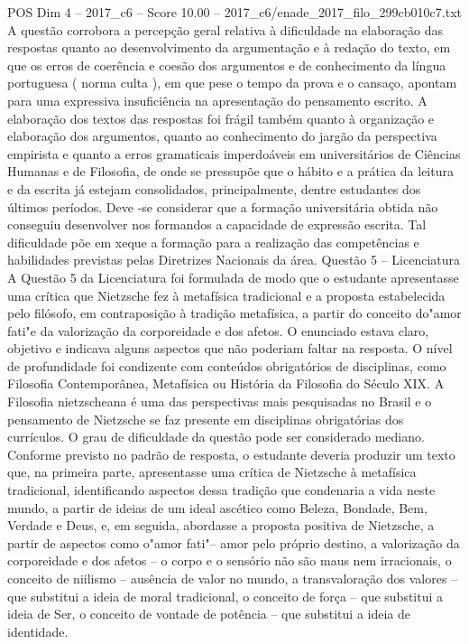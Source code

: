 \begin{textsample}{POS Dim 4 – 2017\_c6 – Score 10.00 – 2017\_c6/enade\_2017\_filo\_299cb010c7.txt}
A questão corrobora a percepção geral relativa à dificuldade na elaboração das respostas quanto ao desenvolvimento da argumentação e à redação do texto, em que os erros de coerência e coesão dos argumentos e de conhecimento da língua portuguesa ( norma culta ), em que pese o tempo da prova e o cansaço, apontam para uma expressiva insuficiência na apresentação do pensamento escrito.
A elaboração dos textos das respostas foi frágil também quanto à organização e elaboração dos argumentos, quanto ao conhecimento do jargão da perspectiva empirista e quanto a erros gramaticais imperdoáveis em universitários de Ciências Humanas e de Filosofia, de onde se pressupõe que o hábito e a prática da leitura e da escrita já estejam consolidados, principalmente, dentre estudantes dos últimos períodos.
Deve -se considerar que a formação universitária obtida não conseguiu desenvolver nos formandos a capacidade de expressão escrita.
Tal dificuldade põe em xeque a formação para a realização das competências e habilidades previstas pelas Diretrizes Nacionais da área.
Questão 5 – Licenciatura A Questão 5 da Licenciatura foi formulada de modo que o estudante apresentasse uma crítica que Nietzsche fez à metafísica tradicional e a proposta estabelecida pelo filósofo, em contraposição à tradição metafísica, a partir do conceito do"amor fati"e da valorização da corporeidade e dos afetos.
O enunciado estava claro, objetivo e indicava alguns aspectos que não poderiam faltar na resposta.
O nível de profundidade foi condizente com conteúdos obrigatórios de disciplinas, como Filosofia Contemporânea, Metafísica ou História da Filosofia do Século XIX.
A Filosofia nietzscheana é uma das perspectivas mais pesquisadas no Brasil e o pensamento de Nietzsche se faz presente em disciplinas obrigatórias dos currículos.
O grau de dificuldade da questão pode ser considerado mediano.
Conforme previsto no padrão de resposta, o estudante deveria produzir um texto que, na primeira parte, apresentasse uma crítica de Nietzsche à metafísica tradicional, identificando aspectos dessa tradição que condenaria a vida neste mundo, a partir de ideias de um ideal ascético como Beleza, Bondade, Bem, Verdade e Deus, e, em seguida, abordasse a proposta positiva de Nietzsche, a partir de aspectos como o"amor fati"– amor pelo próprio destino, a valorização da corporeidade e dos afetos – o corpo e o sensório não são maus nem irracionais, o conceito de niilismo – ausência de valor no mundo, a transvaloração dos valores – que substitui a ideia de moral tradicional, o conceito de força – que substitui a ideia de Ser, o conceito de vontade de potência – que substitui a ideia de identidade.

\end{textsample}
